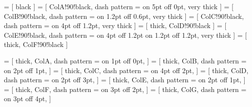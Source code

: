 


 = [
black
]
 = [
	ColA!90!black, 
	dash pattern = {on 5pt off 0pt},
	very thick
]
 = [
	ColB!90!black, 
	dash pattern = {on 1.2pt off 0.6pt},
	very thick
]
 = [
	ColC!90!black, 
	dash pattern = {on 4pt off 1.2pt},
	very thick
]
 = [
	thick, 
	ColD!90!black
]
 = [
	ColE!90!black, 
	dash pattern = {on 4pt off 1.2pt on 1.2pt off 1.2pt},
	very thick
]
 = [
	thick, 
	ColF!90!black
]


 = [
thick, ColA, dash pattern = {on 1pt off 0pt},
]
 = [
thick, ColB, dash pattern = {on 2pt off 1pt},
]
 = [
thick, ColC, dash pattern = {on 4pt off 2pt},
]
 = [
thick, ColD, dash pattern = {on 2pt off 3pt},
]
 = [
thick, ColE, dash pattern = {on 2pt off 1pt},
]
 = [
thick, ColF, dash pattern = {on 3pt off 2pt},
]
 = [
thick, ColG, dash pattern = {on 3pt off 4pt},
]
